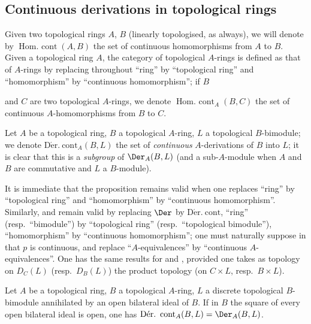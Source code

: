 \subsection{Continuous derivations in topological rings}
\label{subsection:0.20.3}

\begin{env}[20.3.1]
\label{0.20.3.1}
Given two topological rings $A$, $B$ (linearly topologised, as always), we will denote by $\operatorname{Hom.\ cont}(A,B)$ the set of continuous homomorphisms from $A$ to $B$.
Given a topological ring $A$, the category of topological $A$-rings is defined as that of $A$-rings  by replacing throughout ``ring'' by ``topological ring'' and ``homomorphism'' by ``continuous homomorphism''; if $B$

and $C$ are two topological $A$-rings, we denote $\operatorname{Hom.\ cont}_A(B,C)$ the set of continuous $A$-homomorphisms from $B$ to $C$.

Let $A$ be a topological ring, $B$ a topological $A$-ring, $L$ a topological $B$-bimodule; we denote $\operatorname{D\acute{e}r.\ cont}_A(B,L)$ the set of \emph{continuous} $A$-derivations of $B$ into $L$; it is clear that this is a \emph{subgroup} of $\Der_A(B,L)$ (and a sub-$A$-module when $A$ and $B$ are commutative and $L$ a $B$-module).
\end{env}

\begin{env}[20.3.2]
\label{0.20.3.2}
It is immediate that the proposition  remains valid when one replaces ``ring'' by ``topological ring'' and ``homomorphism'' by ``continuous homomorphism''.
Similarly,  and  remain valid by replacing $\Der$ by $\operatorname{D\acute{e}r.\ cont}$, ``ring'' (resp.\ ``bimodule'') by ``topological ring'' (resp.\ ``topological bimodule''), ``homomorphism'' by ``continuous homomorphism''; one must naturally suppose in  that $p$ is continuous, and replace ``$A$-equivalences'' by ``continuous $A$-equivalences''.
One has the same results for  and , provided one takes as topology on $D_C(L)$ (resp.\ $D_B(L)$) the product topology (on $C\times L$, resp.\ $B\times L$).
\end{env}

\begin{proposition}[20.3.3]
\label{0.20.3.3}
Let $A$ be a topological ring, $B$ a topological $A$-ring, $L$ a discrete topological $B$-bimodule annihilated by an open bilateral ideal of $B$.
If in $B$ the square of every open bilateral ideal is open, one has $\operatorname{D\acute{e}r.\ cont}_A(B,L)=\Der_A(B,L)$.
\end{proposition}

